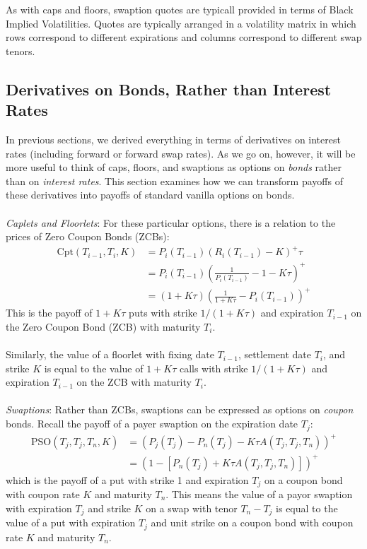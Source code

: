 \documentclass[a4paper,12pt]{scrartcl}
\begin{document}
As with caps and floors, swaption quotes are typicall provided in 
terms of Black Implied Volatilities. Quotes are typically arranged
in a volatility matrix in which rows correspond to different
expirations and columns correspond to different swap tenors. 

\newpage
\subsection{Derivatives on Bonds, Rather than Interest Rates}

In previous sections, we derived everything in terms of derivatives
on interest rates (including forward or forward swap rates). As we
go on, however, it will be more useful to think of caps, floors, and
swaptions as options on \emph{bonds} rather than on \emph{interest
rates}. This section examines  
how we can transform payoffs of these derivatives
into payoffs of standard vanilla options on bonds.
\\
\\
{\sl Caplets and Floorlets}: For these particular options, there is
a relation to the prices of Zero Coupon Bonds (ZCBs):
\begin{align*}
   \text{Cpt}(T_{i-1},T_i,K) &= P_i(T_{i-1})(R_i(T_{i-1}) - K)^+ \tau\\
   &= P_i(T_{i-1})\left( \frac{1}{P_i(T_{i-1})} -1 - K\tau\right)^+ \\
   &= (1+K\tau) \left( \frac{1}{1+K\tau} - P_i(T_{i-1}) \right)^+
\end{align*}
This is the payoff of $1+K\tau$ puts with strike $1/(1+K\tau)$ and
expiration $T_{i-1}$ on the Zero Coupon Bond (ZCB) with maturity $T_i$.
\\
\\
Similarly, the value of a floorlet with fixing date $T_{i-1}$,
settlement date $T_i$, and strike $K$ is equal to the value of $1+K\tau$
calls with strike $1/(1+K\tau)$ and expiration $T_{i-1}$ on the
ZCB with maturity $T_i$.
\\
\\
{\sl Swaptions}: Rather than ZCBs, swaptions can be expressed as options
on \emph{coupon} bonds. Recall the payoff of a payer swaption on the
expiration date $T_j$:
\begin{align*}
 \text{PSO}(T_j,T_j,T_n,K) &= \left(P_j(T_j)- 
   P_n(T_j) - K\tau A(T_j, T_j, T_n)\right)^+ \\
   &= \left(1- [P_n(T_j) + K\tau A(T_j, T_j, T_n)]\right)^+ 
\end{align*}
which is the payoff of a put with strike 1 and expiration $T_j$ on
a coupon bond with coupon rate $K$ and maturity $T_n$. This means
the value of a payor swaption with expiration $T_j$ and strike $K$
on a swap with tenor $T_n-T_j$ is equal to the value of a put with 
expiration $T_j$ and unit strike on a coupon bond with coupon rate
$K$ and maturity $T_n$.
\end{document}
